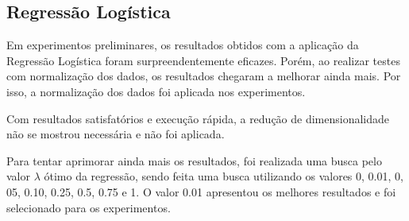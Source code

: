 \subsection{Regressão Logística}

Em experimentos preliminares, os resultados obtidos com a aplicação da Regressão Logística foram surpreendentemente eficazes. Porém, ao realizar testes com normalização dos dados, os resultados chegaram a melhorar ainda mais. Por isso, a normalização dos dados foi aplicada nos experimentos.

Com resultados satisfatórios e execução rápida, a redução de dimensionalidade não se mostrou necessária e não foi aplicada.

Para tentar aprimorar ainda mais os resultados, foi realizada uma busca pelo valor $\lambda$ ótimo da regressão, sendo feita uma busca utilizando os valores 0, 0.01, 0, 05, 0.10, 0.25, 0.5, 0.75 e 1. O valor 0.01 apresentou os melhores resultados e foi selecionado para os experimentos.